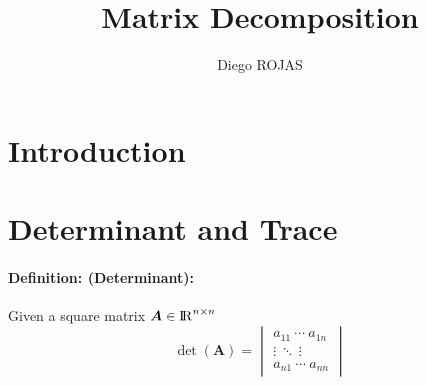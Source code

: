 \documentclass[12pt]{article}
\title{Matrix Decomposition}
\author{Diego ROJAS}
\newcommand{\R}{{\rm I\!R}}
\newcommand{\Rnn}{{\R^{n \times n}}}
\newcommand{\A}{{\bm{A}}}
\newcommand{\0}[0]{\bm{0}}
\newcommand{\xdefinition}[2]{\paragraph{\colorbox{#1!30}{\textbf{Definition:}} (#2):}}
\begin{document}
\maketitle

\section{Introduction}

\section{Determinant and Trace}

\xdefinition{red}{Determinant} Given a square matrix $\A \in \Rnn$ 
%
\begin{equation}
	\det(\A) = \begin{vmatrix}
		a_{11} \ \cdots \ a_{1n} \\
		\vdots \ \ddots \ \vdots \\
		a_{n1} \ \cdots \ a_{nn}
	\end{vmatrix}
\end{equation}
\end{document}
